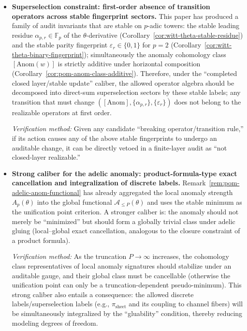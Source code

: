 \begin{itemize}
  \item \textbf{Superselection constraint: first-order absence of transition operators across stable fingerprint sectors.}
  This paper has produced a family of audit invariants that are stable on \(p\)-adic towers: the stable leading residue \(\alpha_{p,r}\in\mathbb{F}_p\) of the \(\theta\)-derivative (Corollary~\ref{cor:witt-theta-stable-residue}) and the stable parity fingerprint \(\varepsilon_r\in\{0,1\}\) for \(p=2\) (Corollary~\ref{cor:witt-theta-binary-fingerprint}); simultaneously the anomaly cohomology class \([\mathrm{Anom}(w)]\) is strictly additive under horizontal composition (Corollary~\ref{cor:pom-anom-class-additive}). Therefore, under the ``completed closed layer/stable update'' caliber, the allowed operator algebra should be decomposed into direct-sum superselection sectors by these stable labels; any transition that must change \(([\mathrm{Anom}],\{\alpha_{p,r}\},\{\varepsilon_r\})\) does not belong to the realizable operators at first order.
  \par\noindent\emph{Verification method:} Given any candidate ``breaking operator/transition rule,'' if its action causes any of the above stable fingerprints to undergo an auditable change, it can be directly vetoed in a finite-layer audit as ``not closed-layer realizable.''

  \item \textbf{Strong caliber for the adelic anomaly: product-formula-type exact cancellation and integralization of discrete labels.}
  Remark~\ref{rem:pom-adelic-anom-functional} has already aggregated the local anomaly strength \(A_p(\theta)\) into the global functional \(\mathcal{A}_{\le P}(\theta)\) and uses the stable minimum as the unification point criterion. A stronger caliber is: the anomaly should not merely be ``minimized'' but should form a globally trivial class under adelic gluing (local--global exact cancellation, analogous to the closure constraint of a product formula).
  \par\noindent\emph{Verification method:} As the truncation \(P\to\infty\) increases, the cohomology class representatives of local anomaly signatures should stabilize under an auditable gauge, and their global class must be cancellable (otherwise the unification point can only be a truncation-dependent pseudo-minimum). This strong caliber also entails a consequence: the allowed discrete labels/superselection labels (e.g., \(\pi_{\mathrm{sheet}}\) and its coupling to channel fibers) will be simultaneously integralized by the ``gluability'' condition, thereby reducing modeling degrees of freedom.


\end{itemize}

